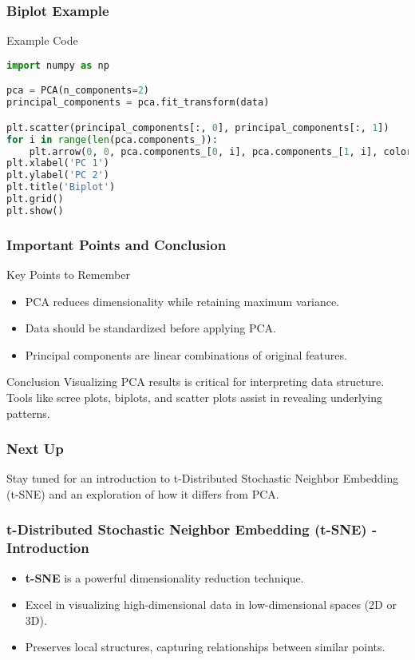 \documentclass[aspectratio=169]{beamer}
\begin{document}
\begin{frame}[fragile]
    \frametitle{Biplot Example}
    \begin{block}{Example Code}
    \begin{lstlisting}[language=Python]
import numpy as np

pca = PCA(n_components=2)
principal_components = pca.fit_transform(data)

plt.scatter(principal_components[:, 0], principal_components[:, 1])
for i in range(len(pca.components_)):
    plt.arrow(0, 0, pca.components_[0, i], pca.components_[1, i], color='r', alpha=0.5)
plt.xlabel('PC 1')
plt.ylabel('PC 2')
plt.title('Biplot')
plt.grid()
plt.show()
    \end{lstlisting}
    \end{block}
\end{frame}

\begin{frame}[fragile]
    \frametitle{Important Points and Conclusion}
    \begin{block}{Key Points to Remember}
        \begin{itemize}
            \item PCA reduces dimensionality while retaining maximum variance.
            \item Data should be standardized before applying PCA.
            \item Principal components are linear combinations of original features.
        \end{itemize}
    \end{block}
    
    \begin{block}{Conclusion}
        Visualizing PCA results is critical for interpreting data structure. Tools like scree plots, biplots, and scatter plots assist in revealing underlying patterns.
    \end{block}
\end{frame}

\begin{frame}[fragile]
    \frametitle{Next Up}
    Stay tuned for an introduction to t-Distributed Stochastic Neighbor Embedding (t-SNE) and an exploration of how it differs from PCA.
\end{frame}

\begin{frame}[fragile]
    \frametitle{t-Distributed Stochastic Neighbor Embedding (t-SNE) - Introduction}
    \begin{itemize}
        \item \textbf{t-SNE} is a powerful dimensionality reduction technique.
        \item Excel in visualizing high-dimensional data in low-dimensional spaces (2D or 3D).
        \item Preserves local structures, capturing relationships between similar points.
    \end{itemize}
\end{frame}
\end{document}
